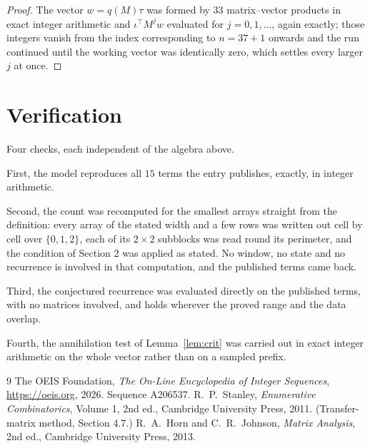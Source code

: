 \documentclass[11pt,a4paper]{article}
\theoremstyle{plain}
\theoremstyle{definition}
\begin{document}
\begin{proof}
The vector $w=q(M)\tau$ was formed by $33$ matrix--vector products in exact integer
arithmetic and $\iota^{\!\top}M^{j}w$ evaluated for $j=0,1,\dots$, again exactly; those
integers vanish from the index corresponding to $n=37+1$ onwards and the run continued
until the working vector was identically zero, which settles every larger $j$ at once.
\end{proof}

\section{Verification}

Four checks, each independent of the algebra above.

First, the model reproduces all $15$ terms the entry publishes, exactly, in integer
arithmetic.

Second, the count was recomputed for the smallest arrays straight from the definition: every
array of the stated width and a few rows was written out cell by cell over $\{0,1,2\}$, each of
its $2\times2$ subblocks was read round its perimeter, and the condition of Section 2 was
applied as stated. No window, no state and no recurrence is involved in that computation, and
the published terms came back.

Third, the conjectured recurrence was evaluated directly on the published terms, with no
matrices involved, and holds wherever the proved range and the data overlap.

Fourth, the annihilation test of Lemma~\ref{lem:crit} was carried out in exact integer
arithmetic on the whole vector rather than on a sampled prefix.

\begin{thebibliography}{9}
 The OEIS Foundation, \emph{The On-Line Encyclopedia of Integer
Sequences}, \url{https://oeis.org}, 2026. Sequence A206537.
 R.~P.~Stanley, \emph{Enumerative Combinatorics}, Volume 1, 2nd ed.,
Cambridge University Press, 2011. (Transfer-matrix method, Section 4.7.)
 R.~A.~Horn and C.~R.~Johnson, \emph{Matrix Analysis}, 2nd ed., Cambridge
University Press, 2013.
\end{thebibliography}
\end{document}
